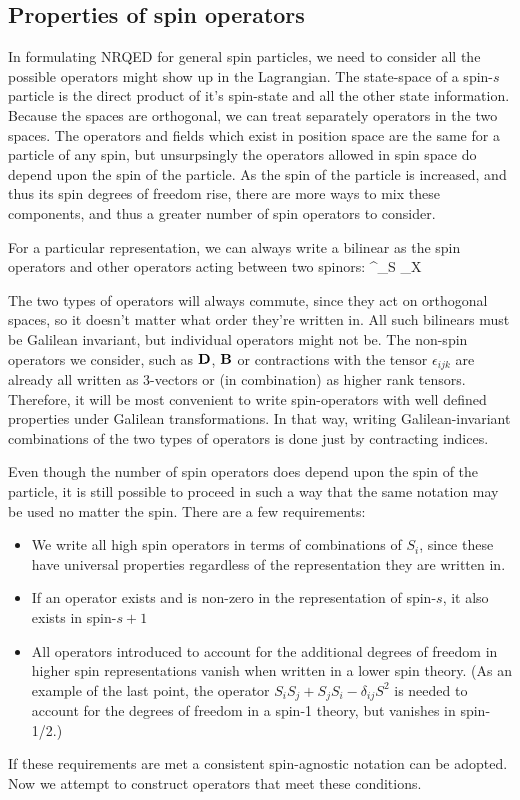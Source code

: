 \subsection{Properties of spin operators}
In formulating NRQED for general spin particles, we need to consider all the possible operators might show up in the Lagrangian.  The state-space of a spin-$s$ particle is the direct product of it's spin-state and all the other state information.  Because the spaces are orthogonal, we can treat separately operators in the two spaces.  The operators and fields which exist in position space are the same for a particle of any spin, but unsurpsingly the operators allowed in spin space do depend upon the spin of the particle.  As the spin of the particle is increased, and thus its spin degrees of freedom rise, there are more ways to mix these components, and thus a greater number of spin operators to consider.

For a particular representation, we can always write a bilinear as the spin operators and other operators acting between two spinors:
\beq
	\Psi^\dagger {}_S _X \Psi
\eeq

The two types of operators will always commute, since they act on orthogonal spaces, so it doesn't matter what order they're written in.  All such bilinears must be Galilean invariant, but individual operators might not be.  The non-spin operators we consider, such as $\mathbf{D}$, $\mathbf{B}$ or contractions with the tensor $\epsilon_{ijk}$ are already all written as 3-vectors or (in combination) as higher rank tensors.  Therefore, it will be most convenient to write spin-operators with well defined properties under Galilean transformations.  In that way, writing Galilean-invariant combinations of the two types of operators is done just by contracting indices. 

Even though the number of spin operators does depend upon the spin of the particle, it is still possible to proceed in such a way that the same notation may be used no matter the spin.  There are a few requirements:
\begin{itemize}
  \item We write all high spin operators in terms of combinations of $S_i$, since these have universal properties regardless of the representation they are written in.
  \item If an operator exists and is non-zero in the representation of spin-$s$, it also exists in spin-$s+1$
  \item All operators introduced to account for the additional degrees of freedom in higher spin representations vanish when written in a lower spin theory.  (As an example of the last point, the operator $S_i S_j + S_j S_i - \delta_{ij} S^2$ is needed to account for the degrees of freedom in a spin-1 theory, but vanishes in spin-1/2.)
\end{itemize}
If these requirements are met a consistent spin-agnostic notation can be adopted.  Now we attempt to construct operators that meet these conditions.

